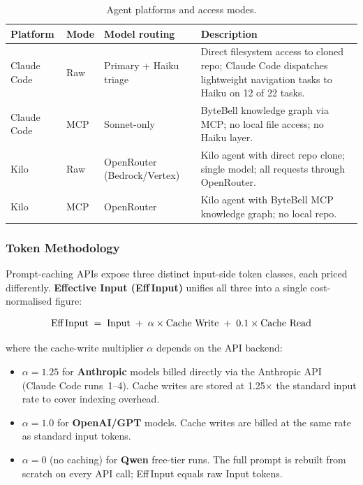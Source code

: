 \begin{table}[h]
\centering
\caption{Agent platforms and access modes.}\label{tab:platforms}
\begin{tabular}{lll p{7cm}}
\toprule
\textbf{Platform} & \textbf{Mode} & \textbf{Model routing} & \textbf{Description} \\
\midrule
Claude Code & Raw & Primary + Haiku triage & Direct filesystem access to cloned repo; Claude Code dispatches lightweight navigation tasks to Haiku on 12 of 22 tasks. \\[4pt]
Claude Code & MCP & Sonnet-only            & ByteBell knowledge graph via MCP; no local file access; no Haiku layer. \\[4pt]
Kilo        & Raw & OpenRouter (Bedrock/Vertex) & Kilo agent with direct repo clone; single model; all requests through OpenRouter. \\[4pt]
Kilo        & MCP & OpenRouter             & Kilo agent with ByteBell MCP knowledge graph; no local repo. \\
\bottomrule
\end{tabular}
\end{table}

\subsubsection{Token Methodology}

Prompt-caching APIs expose three distinct input-side token classes,
each priced differently.
\textbf{Effective Input (Eff\,Input)} unifies all three into a single
cost-normalised figure:

\begin{equation*}
\text{Eff\,Input} \;=\; \text{Input} \;+\; \alpha \times \text{Cache Write} \;+\; 0.1 \times \text{Cache Read}
\end{equation*}

\noindent where the cache-write multiplier $\alpha$ depends on the API backend:

\begin{itemize}[nosep, leftmargin=*]
  \item $\alpha = 1.25$ for \textbf{Anthropic} models billed directly via the Anthropic
        API (Claude Code runs~1--4).
        Cache writes are stored at 1.25$\times$ the standard input rate to cover indexing overhead.
  \item $\alpha = 1.0$ for \textbf{OpenAI/GPT} models.
        Cache writes are billed at the same rate as standard input tokens.
  \item $\alpha = 0$ (no caching) for \textbf{Qwen} free-tier runs.
        The full prompt is rebuilt from scratch on every API call;
        Eff\,Input equals raw Input tokens.
\end{itemize}

